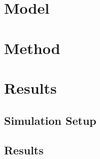 \documentclass{article}
\begin{document}

\section{Model}
 

\section{Method}

\section{Results}
  \subsection{Simulation Setup}

  \subsection{Results}
\end{document}
